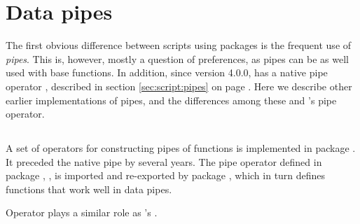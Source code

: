 \documentclass[krantz2]{krantz}\usepackage{knitr}
\begin{document}

\section{Data pipes}\label{sec:data:pipes}
The first obvious difference between scripts using  packages is the frequent use of \emph{pipes}. This is, however, mostly a question of preferences, as pipes can be as well used with base \Rlang functions. In addition, since version 4.0.0, \Rlang has a native pipe operator \Roperator{\textbar >}, described in section \ref{sec:script:pipes} on page \pageref{sec:script:pipes}. Here we describe other earlier implementations of pipes, and the differences among these and \Rlang's pipe operator.

\subsection{}
A set of operators for constructing pipes of \Rlang functions is implemented in package . It preceded the native \Rlang pipe by several years. The pipe operator defined in package , \Roperator{\%>\%}, is imported and re-exported by package , which in turn defines functions that work well in data pipes.

Operator \Roperator{\%>\%} plays a similar role as \Rlang's \Roperator{\textbar >}.

\begin{knitrout}\footnotesize
{}\color{fgcolor}\begin{kframe}
\begin{alltt}
 \hlkwb{<-} \hlopt{:}
\end{alltt}
\end{kframe}
\end{knitrout}

\begin{knitrout}\footnotesize
{}\color{fgcolor}
\end{knitrout}
\end{document}
